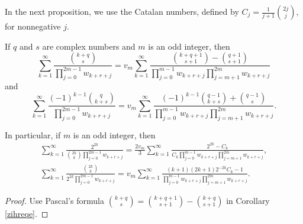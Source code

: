 \documentclass[12pt,reqno]{article}
\begin{document}
In the next proposition, we use the Catalan numbers, defined by 
$C_j=\frac{1}{j+1}\binom{2j}{j}$, for nonnegative $j$.
\begin{proposition}
	If $q$ and $s$ are complex numbers and $m$ is an odd integer, then
		\begin{equation}\label{Prop6_1}
		\sum_{k = 1}^\infty  {\frac{{\binom{{k + q}}s}}{{\prod\limits_{j = 0}^{2m - 1} {w_{k + r + j} } }}}  = v_m \sum_{k = 1}^\infty  {\frac{\binom{k + q + 1}{s + 1} - \binom{q + 1}{s + 1}}{{\prod\limits_{j = 0}^{m - 1} {w_{k + r + j} } \prod\limits_{j = m + 1}^{2m} {w_{k + r + j} } }}} 
		\end{equation}
	and
		\begin{equation}\label{Prop6_2}
		\sum_{k = 1}^\infty  {\frac{{( - 1)^{k - 1} \binom{q}{k + s}}}{\prod\limits_{j = 0}^{2m - 1} w_{k + r + j}}}  = v_m \sum_{k = 1}^\infty  \frac{{ {( - 1)^{k - 1} \binom{{q - 1}}{{k + s}} + \binom{{q - 1}}{s}}}}{{\prod\limits_{j = 0}^{m - 1} {w_{k + r + j} } \prod\limits_{j = m + 1}^{2m} {w_{k + r + j} } }}  .
		\end{equation}
	
	In particular, if $m$ is an odd integer, then
		\begin{gather*}
		\sum_{k = 1}^\infty  {\frac{{2^{2k} }}{{\binom{{2k}}{k}\prod\limits_{j = 0}^{2m - 1} {w_{k + r + j} } }}}  = \frac{2v_m}{3} \sum_{k = 1}^\infty  {\frac{{2^{2k}  - C_k }}{{C_k \prod\limits_{j = 0}^{m - 1} {w_{k + r + j} } \prod\limits_{j = m + 1}^{2m} {w_{k + r + j} } }}},\\ 
		\sum_{k = 1}^\infty  {\frac{{\binom{2k}{k}}}{{2^{2k} \prod\limits_{j = 0}^{2m - 1} {w_{k + r + j} } }}}  = v_m \sum_{k = 1}^\infty  {\frac{{(k+1)( 2k + 1 )2^{-2k}C_k - 1 }}{{ \prod\limits_{j = 0}^{m - 1} {w_{k + r + j} } \prod\limits_{j = m + 1}^{2m} {w_{k + r + j} } }}} .
		\end{gather*}
\end{proposition}
\begin{proof}
	Use Pascal's formula
	$\binom{k+q}s=\binom{k+q+1}{s+1}-\binom{k+q}{s+1}$
	in Corollary \ref{zihreqe}.
\end{proof}
\end{document}
